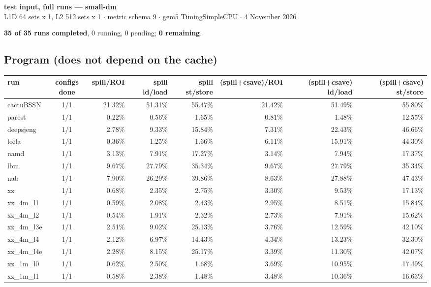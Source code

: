 \documentclass[10pt,a4paper,landscape]{article}
\begin{document}
\begin{center}
{\large\bfseries test input, full runs --- small-dm}\\[3pt]
{\small L1D 64 sets x 1, L2 512 sets x 1 $\cdot$ metric schema 9 $\cdot$ gem5 TimingSimpleCPU $\cdot$ 4 November 2026}
\end{center}
\textbf{35 of 35 runs completed}, 0 running, 0 pending; \textbf{0 remaining}.\par
\subsection*{Program (does not depend on the cache)}
{\footnotesize
\begin{longtable}{lcrrrrrr}
\toprule
run & configs done & spill/ROI & spill ld/load & spill st/store & (spill+csave)/ROI & (spill+csave) ld/load & (spill+csave) st/store \\
\midrule
\endhead
\bottomrule
\endfoot
cactuBSSN & 1/1 & 21.32\% & 51.31\% & 55.47\% & 21.42\% & 51.49\% & 55.80\% \\
parest & 1/1 & 0.22\% & 0.56\% & 1.65\% & 0.81\% & 1.48\% & 12.55\% \\
deepsjeng & 1/1 & 2.78\% & 9.33\% & 15.84\% & 7.31\% & 22.43\% & 46.66\% \\
leela & 1/1 & 0.36\% & 1.25\% & 1.66\% & 6.11\% & 15.91\% & 44.30\% \\
namd & 1/1 & 3.13\% & 7.91\% & 17.27\% & 3.14\% & 7.94\% & 17.37\% \\
lbm & 1/1 & 9.67\% & 27.79\% & 35.34\% & 9.67\% & 27.79\% & 35.34\% \\
nab & 1/1 & 7.90\% & 26.29\% & 39.86\% & 8.63\% & 27.88\% & 47.43\% \\
xz & 1/1 & 0.68\% & 2.35\% & 2.75\% & 3.30\% & 9.53\% & 17.13\% \\
xz\_4m\_l1 & 1/1 & 0.59\% & 2.08\% & 2.43\% & 2.95\% & 8.51\% & 15.84\% \\
xz\_4m\_l2 & 1/1 & 0.54\% & 1.91\% & 2.32\% & 2.73\% & 7.91\% & 15.62\% \\
xz\_4m\_l3e & 1/1 & 2.51\% & 9.02\% & 25.13\% & 3.76\% & 12.59\% & 42.10\% \\
xz\_4m\_l4 & 1/1 & 2.12\% & 6.97\% & 14.43\% & 4.34\% & 13.23\% & 32.30\% \\
xz\_4m\_l4e & 1/1 & 2.28\% & 8.15\% & 25.17\% & 3.39\% & 11.30\% & 42.07\% \\
xz\_1m\_l0 & 1/1 & 0.62\% & 2.50\% & 1.68\% & 3.69\% & 10.95\% & 17.49\% \\
xz\_1m\_l1 & 1/1 & 0.58\% & 2.38\% & 1.48\% & 3.48\% & 10.36\% & 16.63\% \\

\end{longtable}}
\end{document}
